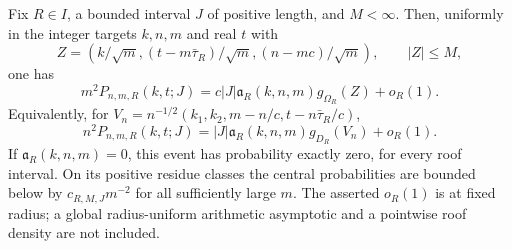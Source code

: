 \begin{theorem}
\label{thm:v40-arithmetic-return-LLT}
Fix $R\in I$, a bounded interval $J$ of positive length, and $M<\infty$.
Then, uniformly in the integer targets $k,n,m$ and real $t$ with
\[
 Z=\left(k/\sqrt m,(t-m\bar\tau_R)/\sqrt m,(n-mc)/\sqrt m\right),
                        \qquad |Z|\le M,
\]
one has
\begin{equation}\label{eq:v40-arithmetic-interval-LLT}
 m^2P_{n,m,R}(k,t;J)
       =c|J|\mathfrak a_R(k,n,m)g_{\Omega_R}(Z)+o_R(1).
\end{equation}
Equivalently, for
$V_n=n^{-1/2}(k_1,k_2,m-n/c,t-n\bar\tau_R/c)$,
\begin{equation}\label{eq:v40-arithmetic-original-normalization}
 n^2P_{n,m,R}(k,t;J)
       =|J|\mathfrak a_R(k,n,m)g_{D_R}(V_n)+o_R(1).
\end{equation}
If $\mathfrak a_R(k,n,m)=0$, this event has probability exactly zero,
for every roof interval. On its positive residue classes the central
probabilities are bounded below by $c_{R,M,J}m^{-2}$ for all
sufficiently large $m$.
The asserted $o_R(1)$ is at fixed radius; a global radius-uniform
arithmetic asymptotic and a pointwise roof density are not included.
\end{theorem}
